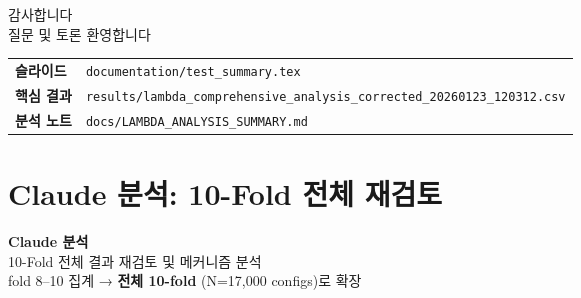 \documentclass[aspectratio=169,10pt]{beamer}
\begin{document}
\begin{frame}[plain]
	\begin{center}
		\vspace{2.0cm}
		{\LARGE 감사합니다}\\[1.2em]
		{\large 질문 및 토론 환영합니다}\\[2em]
		\begin{tabular}{ll}
			\textbf{슬라이드} & \texttt{documentation/test\_summary.tex} \\
			\textbf{핵심 결과} & \texttt{results/lambda\_comprehensive\_analysis\_corrected\_20260123\_120312.csv} \\
			\textbf{분석 노트} & \texttt{docs/LAMBDA\_ANALYSIS\_SUMMARY.md}
		\end{tabular}
	\end{center}
\end{frame}

\section{Claude 분석: 10-Fold 전체 재검토}

\begin{frame}[plain]
	\begin{center}
		\vspace{2.2cm}
		{\LARGE \textbf{Claude 분석}}\\[0.8em]
		{\large 10-Fold 전체 결과 재검토 및 메커니즘 분석}\\[0.6em]
		{\small fold 8--10 집계 → \textbf{전체 10-fold} (N=17,000 configs)로 확장}
	\end{center}
\end{frame}
\end{document}
